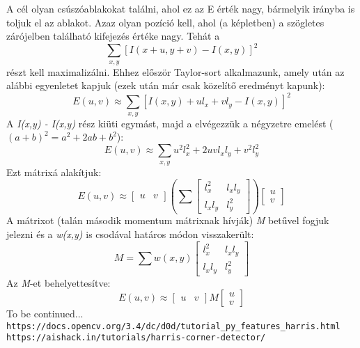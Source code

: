 \documentclass[12pt]{report}
\begin{document}
                A cél olyan csúszóablakokat találni, ahol ez az E érték nagy, bármelyik irányba is toljuk el az ablakot. Azaz olyan pozíció kell, ahol (a képletben) a szögletes zárójelben található kifejezés értéke nagy. Tehát a 
                \[\sum_{x,y}[I(x+u,y+v) - I(x,y)]^2\]
                részt kell maximalizálni. Ehhez először Taylor-sort alkalmazunk, amely után az alábbi egyenletet kapjuk (ezek után már csak közelítő eredményt kapunk):
                \[E(u,v) \approx \sum_{x,y}[I(x,y) + ul_x + vl_y - I(x,y)]^2\]
                A \textit{I(x,y) - I(x,y)} rész kiüti egymást, majd a elvégezzük a négyzetre emelést ($(a+b)^2 = a^2 + 2ab + b^2$):
                \[E(u,v) \approx \sum_{x,y}u^2l_x^2 + 2uvl_xl_y + v^2l_y^2\]
                Ezt mátrixá alakítjuk:
                \[E(u,v) \approx \begin{bmatrix} u & v \end{bmatrix} (\sum \begin{bmatrix} l_x^2 & l_xl_y \\ l_xl_y & l_y^2 \end{bmatrix}) \begin{bmatrix} u \\ v \end{bmatrix}\]
                A mátrixot (talán második momentum mátrixnak hívják) \textit{M} betűvel fogjuk jelezni és a \textit{w(x,y)} is csodával határos módon visszakerült:
                \[M = \sum w(x,y)\begin{bmatrix} l_x^2 & l_xl_y \\ l_xl_y & l_y^2 \end{bmatrix}\]
                Az \textit{M}-et behelyettesítve:
                \[E(u,v) \approx \begin{bmatrix} u & v \end{bmatrix} M \begin{bmatrix} u \\ v \end{bmatrix}\]
                To be continued...\\
                \texttt{https://docs.opencv.org/3.4/dc/d0d/tutorial\_py\_features\_harris.html}\\
                \texttt{https://aishack.in/tutorials/harris-corner-detector/}
\end{document}
